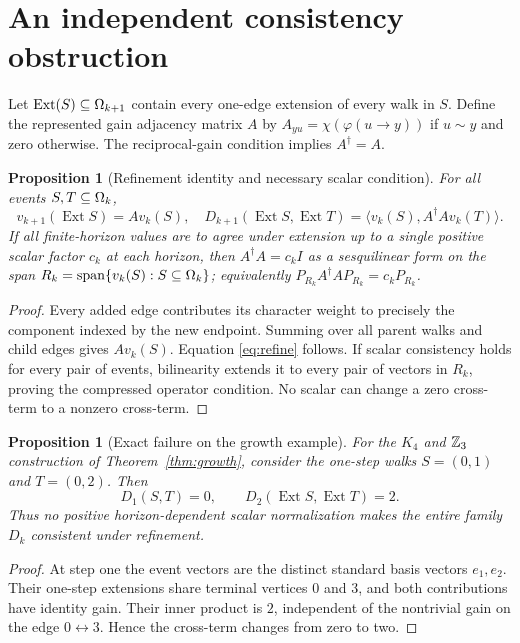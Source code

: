 \documentclass[11pt]{article}
\newtheorem{proposition}[theorem]{Proposition}
\begin{document}
\section{An independent consistency obstruction}
Let $\operatorname{Ext}(S)\subseteq\Omega_{k+1}$ contain every one-edge extension of every walk in $S$. Define the represented gain adjacency matrix $A$ by $A_{yu}=\chi(\varphi(u\to y))$ if $u\sim y$ and zero otherwise. The reciprocal-gain condition implies $A^\dagger=A$.
\begin{proposition}[Refinement identity and necessary scalar condition]\label{prop:refine}
For all events $S,T\subseteq\Omega_k$,
\begin{equation}\label{eq:refine}
 v_{k+1}(\operatorname{Ext}S)=A v_k(S),\quad D_{k+1}(\operatorname{Ext}S,\operatorname{Ext}T)=\langle v_k(S),A^\dagger A v_k(T)\rangle.
\end{equation}
If all finite-horizon values are to agree under extension up to a single positive scalar factor $c_k$ at each horizon, then $A^\dagger A=c_k I$ as a sesquilinear form on the span $R_k=\operatorname{span}\{v_k(S):S\subseteq\Omega_k\}$; equivalently $P_{R_k}A^\dagger A P_{R_k}=c_kP_{R_k}$.
\end{proposition}
\begin{proof}
Every added edge contributes its character weight to precisely the component indexed by the new endpoint. Summing over all parent walks and child edges gives $Av_k(S)$. Equation \eqref{eq:refine} follows. If scalar consistency holds for every pair of events, bilinearity extends it to every pair of vectors in $R_k$, proving the compressed operator condition. No scalar can change a zero cross-term to a nonzero cross-term.
\end{proof}
\begin{proposition}[Exact failure on the growth example]\label{prop:fail}
For the $K_4$ and $\mathbb Z_3$ construction of Theorem~\ref{thm:growth}, consider the one-step walks $S=(0,1)$ and $T=(0,2)$. Then
\[
 D_1(S,T)=0,\qquad D_2(\operatorname{Ext}S,\operatorname{Ext}T)=2.
\]
Thus no positive horizon-dependent scalar normalization makes the entire family $D_k$ consistent under refinement.
\end{proposition}
\begin{proof}
At step one the event vectors are the distinct standard basis vectors $e_1,e_2$. Their one-step extensions share terminal vertices $0$ and $3$, and both contributions have identity gain. Their inner product is $2$, independent of the nontrivial gain on the edge $0\leftrightarrow3$. Hence the cross-term changes from zero to two.
\end{proof}
\end{document}
